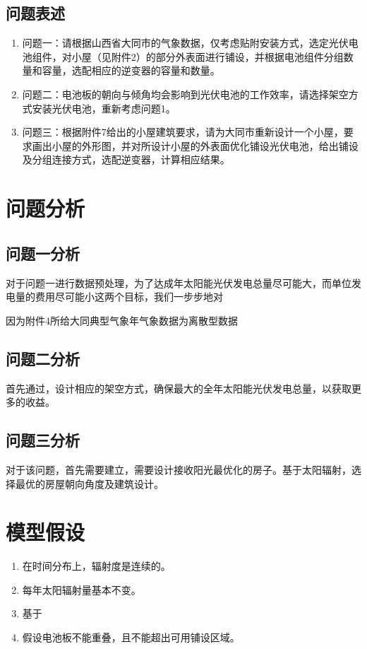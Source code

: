 \documentclass{ctexart}
\begin{document}
    \subsection{问题表述}
    \begin{enumerate}[(1)]
        \item 问题一：请根据山西省大同市的气象数据，仅考虑贴附安装方式，选定光伏电池组件，对小屋（见附件2）的部分外表面进行铺设，并根据电池组件分组数量和容量，选配相应的逆变器的容量和数量。
        \item 问题二：电池板的朝向与倾角均会影响到光伏电池的工作效率，请选择架空方式安装光伏电池，重新考虑问题1。
        \item 问题三：根据附件7给出的小屋建筑要求，请为大同市重新设计一个小屋，要求画出小屋的外形图，并对所设计小屋的外表面优化铺设光伏电池，给出铺设及分组连接方式，选配逆变器，计算相应结果。
    \end{enumerate}

    \section{问题分析}
    \subsection{问题一分析}
    对于问题一进行数据预处理，为了达成年太阳能光伏发电总量尽可能大，而单位发电量的费用尽可能小这两个目标，我们一步步地对

	因为附件4所给大同典型气象年气象数据为离散型数据
    \subsection{问题二分析}
    首先通过，设计相应的架空方式，确保最大的全年太阳能光伏发电总量，以获取更多的收益。
    \subsection{问题三分析}
    对于该问题，首先需要建立，需要设计接收阳光最优化的房子。基于太阳辐射，选择最优的房屋朝向角度及建筑设计。

    \section{模型假设}
    \begin{enumerate}[(1)]
        \item 在时间分布上，辐射度是连续的。
        \item 每年太阳辐射量基本不变。
        \item 基于
        \item 假设电池板不能重叠，且不能超出可用铺设区域。
    \end{enumerate}
\end{document}
